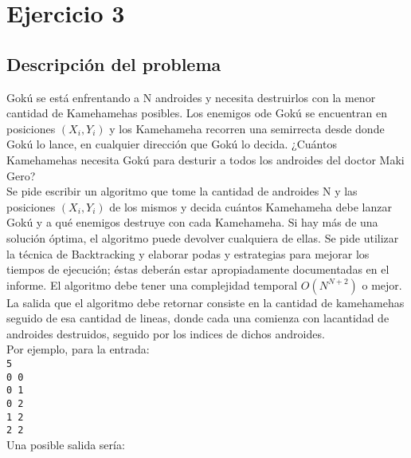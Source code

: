 \section{Ejercicio 3}
    \subsection{Descripción del problema}

        Gokú se está enfrentando a N androides y necesita destruirlos con la menor cantidad de Kamehamehas posibles. Los enemigos ode Gokú se encuentran en posiciones $(X_i , Y_i)$ y los Kamehameha recorren una semirrecta desde donde Gokú lo lance, en cualquier dirección que Gokú lo decida. ¿Cuántos Kamehamehas necesita Gokú para desturir a todos los androides del doctor Maki Gero? \\

        Se pide escribir un algoritmo que tome la cantidad de androides N y las posiciones $(X_i , Y_i)$ de los mismos y decida cuántos Kamehameha debe lanzar Gokú y a qué enemigos destruye con cada Kamehameha. Si hay más de una solución óptima, el algoritmo puede devolver cualquiera de ellas. Se pide utilizar la técnica de Backtracking y elaborar podas y estrategias para mejorar los tiempos de ejecución; éstas deberán estar apropiadamente documentadas en el informe. El algoritmo debe tener una complejidad temporal $O(N^{N+2})$ o mejor. \\

        La salida que el algoritmo debe retornar consiste en la cantidad de kamehamehas seguido de esa cantidad de lineas, donde cada una comienza con lacantidad de androides destruidos, seguido por los indices de dichos androides. \\

        Por ejemplo, para la entrada: \\

        \texttt{5}   \\
        \texttt{0 0} \\
        \texttt{0 1} \\
        \texttt{0 2} \\
        \texttt{1 2} \\
        \texttt{2 2} \\

        Una posible salida sería: \\

